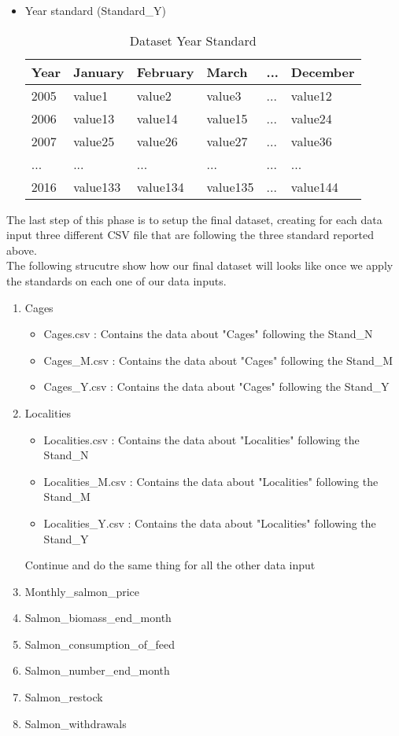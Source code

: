\begin{itemize}
\item Year standard (Standard\_Y)
\begin{table}[ht] 
    \centering 
    \begin{tabular}{ | l | l | l | l | l | l |}
        \hline
       	Year & January & February & March & ... & December\\ \hline
        2005 & value1 & value2 & value3 & ... & value12\\ \hline
        2006 & value13 & value14 & value15 & ... & value24\\ \hline
        2007 & value25 & value26 & value27 & ... & value36\\ \hline
        ... & ... & ... & ... & ... & ...\\ \hline
        2016 & value133 & value134 & value135 & ... & value144\\ \hline
    \end{tabular}
    \caption[Dataset Year Standard]{Dataset Year Standard}
    \label{table: Dataset_Year_Standard} 
\end{table}  
\end{itemize}

The last step of this phase is to setup the final dataset, creating for each data input three different CSV file that are following the three standard reported above.\\
The following strucutre show how our final dataset will looks like once we apply the standards on each one of our data inputs.
\begin{enumerate}
\item Cages
	\begin{itemize}
		\item Cages.csv : Contains the data about "Cages" following the Stand\_N
		\item Cages\_M.csv : Contains the data about "Cages" following the Stand\_M
		\item Cages\_Y.csv : Contains the data about "Cages" following the Stand\_Y
	\end{itemize}
\item Localities
	\begin{itemize}
		\item Localities.csv : Contains the data about "Localities" following the Stand\_N
		\item Localities\_M.csv : Contains the data about "Localities" following the Stand\_M
		\item Localities\_Y.csv : Contains the data about "Localities" following the Stand\_Y
	\end{itemize}
Continue and do the same thing for all the other data input
\item Monthly\_salmon\_price 
\item Salmon\_biomass\_end\_month
\item Salmon\_consumption\_of\_feed
\item Salmon\_number\_end\_month
\item Salmon\_restock
\item Salmon\_withdrawals
\end{enumerate}

